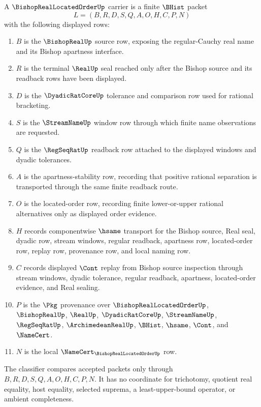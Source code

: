 \begin{definition}
\label{def:bishop-real-located-order-carrier}
A $\BishopRealLocatedOrderUp$ carrier is a finite $\BHist$ packet
$$
L=(B,R,D,S,Q,A,O,H,C,P,N)
$$
with the following displayed rows:
\begin{enumerate}
\item $B$ is the $\BishopRealUp$ source row, exposing the regular-Cauchy real name and its Bishop apartness interface.
\item $R$ is the terminal $\RealUp$ seal reached only after the Bishop source and its readback rows have been displayed.
\item $D$ is the $\DyadicRatCoreUp$ tolerance and comparison row used for rational bracketing.
\item $S$ is the $\StreamNameUp$ window row through which finite name observations are requested.
\item $Q$ is the $\RegSeqRatUp$ readback row attached to the displayed windows and dyadic tolerances.
\item $A$ is the apartness-stability row, recording that positive rational separation is transported through the same finite readback route.
\item $O$ is the located-order row, recording finite lower-or-upper rational alternatives only as displayed order evidence.
\item $H$ records componentwise $\hsame$ transport for the Bishop source, Real seal, dyadic row, stream windows, regular readback, apartness row, located-order row, replay row, provenance row, and local naming row.
\item $C$ records displayed $\Cont$ replay from Bishop source inspection through stream windows, dyadic tolerance, regular readback, apartness, located-order evidence, and Real sealing.
\item $P$ is the $\Pkg$ provenance over $\BishopRealLocatedOrderUp$, $\BishopRealUp$, $\RealUp$, $\DyadicRatCoreUp$, $\StreamNameUp$, $\RegSeqRatUp$, $\ArchimedeanRealUp$, $\BHist$, $\hsame$, $\Cont$, and $\NameCert$.
\item $N$ is the local $\NameCert_{\BishopRealLocatedOrderUp}$ row.
\end{enumerate}
The classifier compares accepted packets only through $B,R,D,S,Q,A,O,H,C,P,N$. It has no coordinate for trichotomy, quotient real equality, host equality, selected suprema, a least-upper-bound operator, or ambient completeness.
\end{definition}

